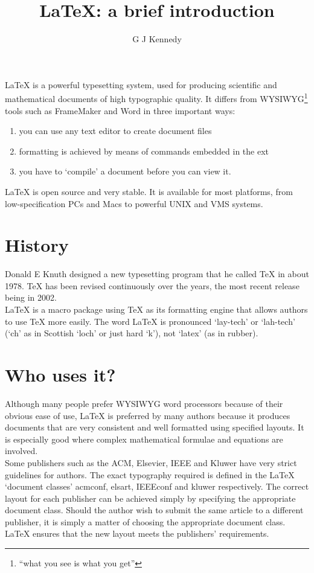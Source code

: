 \documentclass{Letter}
\begin{document}
\title{\LaTeX: a brief introduction}
\author{G J Kennedy} 

\maketitle

LaTeX is a powerful typesetting system, used for producing scientific and mathematical documents of high typographic quality. It differs from WYSIWYG\footnote{``what you see is what you get''} tools such as FrameMaker and Word in three important ways:

\begin{enumerate}
\item you can use any text editor to create document files
\item formatting is achieved by means of commands embedded in the ext
\item you have to `compile' a document before you can view it.
\end{enumerate}

LaTeX is open source and very stable. It is available for most platforms, from low-specification PCs and Macs to powerful UNIX and VMS systems. 

\section {History}
Donald E Knuth designed a new typesetting program that he called TeX in about 1978. TeX has been revised continuously over the years, the most recent release being in 2002.\\
LaTeX is a macro package using TeX as its formatting engine that allows authors to use TeX more easily. The word LaTeX is pronounced `lay-tech' or `lah-tech' (`ch' as in Scottish `loch' or just hard `k'), not `latex' (as in rubber).
\section{Who uses it?}
Although many people prefer WYSIWYG word processors because of their obvious ease of use, LaTeX is preferred by many authors because it produces documents that are very consistent and well formatted using specified layouts. It is especially good where complex mathematical formulae and equations are involved.\\ 
Some publishers such as the ACM, Elsevier, IEEE and Kluwer have very strict guidelines for authors. The exact typography required is defined in the LaTeX `document classes' acmconf, elsart, IEEEconf and kluwer respectively. The correct layout for each publisher can be achieved simply by specifying the appropriate document class.  Should the author wish to submit the same article to a different publisher, it is simply a matter of choosing the appropriate document class. LaTeX ensures that the new layout meets the publishers' requirements.
\end{document}
